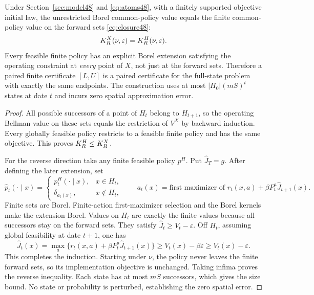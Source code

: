 \begin{theorem}\label{thm:closure48}
Under Section~\ref{sec:model48} and \eqref{eq:atoms48}, with a finitely supported objective initial law, the unrestricted Borel common-policy value equals the finite common-policy value on the forward sets \eqref{eq:closure48}:
\begin{equation}\label{eq:exactclosure48}
 K_R^X(\nu,\varepsilon)=K_R^H(\nu,\varepsilon).
\end{equation}
Every feasible finite policy has an explicit Borel extension satisfying the operating constraint at \emph{every} point of $X$, not just at the forward sets. Therefore a paired finite certificate $[L,U]$ is a paired certificate for the full-state problem with exactly the same endpoints. The construction uses at most $|H_0|(mS)^t$ states at date $t$ and incurs zero spatial approximation error.
\end{theorem}
\begin{proof}
All possible successors of a point of $H_t$ belong to $H_{t+1}$, so the operating Bellman value on these sets equals the restriction of $V^X$ by backward induction. Every globally feasible policy restricts to a feasible finite policy and has the same objective. This proves $K_R^H\le K_R^X$.

For the reverse direction take any finite feasible policy $p^H$. Put $\widehat J_T=g$. After defining the later extension, set
\begin{equation}\label{eq:extension48}
 \widehat p_t(\cdot\mid x)=
 \begin{cases}
 p_t^H(\cdot\mid x),&x\in H_t,\\
 \delta_{a_t(x)},&x\notin H_t,
 \end{cases}\qquad
 a_t(x)=\text{first maximizer of }r_t(x,a)+\beta P_t^a\widehat J_{t+1}(x).
\end{equation}
Finite sets are Borel. Finite-action first-maximizer selection and the Borel kernels make the extension Borel. Values on $H_t$ are exactly the finite values because all successors stay on the forward sets. They satisfy $\widehat J_t\ge V_t-\varepsilon$. Off $H_t$, assuming global feasibility at date $t+1$, one has
\[
 \widehat J_t(x)=\max_a\{r_t(x,a)+\beta P_t^a\widehat J_{t+1}(x)\}
 \ge V_t(x)-\beta\varepsilon\ge V_t(x)-\varepsilon.
\]
This completes the induction. Starting under $\nu$, the policy never leaves the finite forward sets, so its implementation objective is unchanged. Taking infima proves the reverse inequality. Each state has at most $mS$ successors, which gives the size bound. No state or probability is perturbed, establishing the zero spatial error.
\end{proof}

